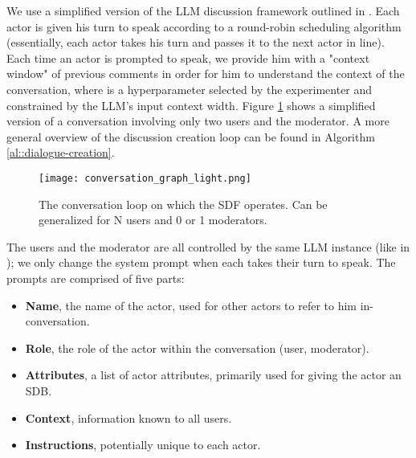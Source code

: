 We use a simplified version of the LLM discussion framework outlined in \citet{abdelnabi2024cooperationcompetitionmaliciousnessllmstakeholders}. Each actor is given his turn to speak according to a round-robin scheduling algorithm (essentially, each actor takes his turn and passes it to the next actor in line). Each time an actor is prompted to speak, we provide him with a "context window" of  previous comments in order for him to understand the context of the conversation, where  is a hyperparameter selected by the experimenter and constrained by the LLM's input context width. Figure \ref{fig::conversation} shows a simplified version of a conversation involving only two users and the moderator. A more general overview of the discussion creation loop can be found in Algorithm \ref{al::dialogue-creation}.


\begin{figure}
	\centering
	\texttt{[image: conversation\_graph\_light.png]}
	\caption{The conversation loop on which the \ac{SDF} operates. Can be generalized for N users and 0 or 1 moderators.}
	\label{fig::conversation}
\end{figure}

The users and the moderator are all controlled by the same LLM instance (like in \citet{park2022socialsimulacracreatingpopulated}); we only change the system prompt when each takes their turn to speak. The prompts are comprised of five parts:

\begin{itemize}
	\item \textbf{Name}, the name of the actor, used for other actors to refer to him in-conversation.
	\item \textbf{Role}, the role of the actor within the conversation (user, moderator).
	\item \textbf{Attributes}, a list of actor attributes, primarily used for giving the actor an \ac{SDB}.
	\item \textbf{Context}, information known to all users.
	\item \textbf{Instructions}, potentially unique to each actor. 
\end{itemize}


